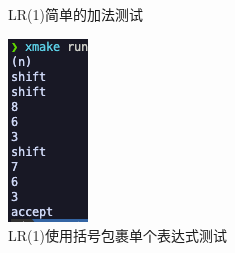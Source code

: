 \begin{figure}[htbp]
\begin{minipage}[t]{0.2\textwidth}
        \caption{LR(1)简单的加法测试}
        \label{fig:lr-2}
    \end{minipage}
    \begin{minipage}[t]{0.2\textwidth}
        \centering
        \includegraphics[width=\textwidth]{images/lr_3.png}
        \caption{LR(1)使用括号包裹单个表达式测试}
        \label{fig:lr-3}
    \end{minipage}
\end{figure}

